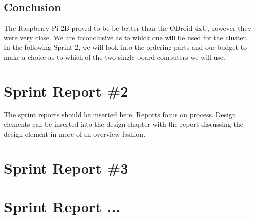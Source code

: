 \subsection{Conclusion}
The Raspberry Pi 2B proved to be be better than the ODroid 4xU, however they were very close. We are inconclusive as to whick one will be used for the cluster. In the following Sprint 2, we will look into the ordering parts and our budget to make a choice as to which of the two single-board computers we will use.


\section{Sprint Report \#2}
The sprint reports should be inserted here.     Reports focus on process.  Design elements can be inserted into the design chapter with the report discussing the design element in more of an overview fashion.
\section{Sprint Report \#3}

\section{Sprint Report ...}
